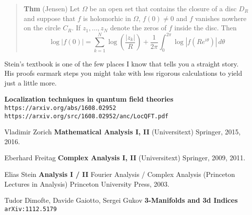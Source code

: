 \documentclass[12pt]{article}
\begin{document}
\begin{quotation}\noindent \textbf{Thm} (Jensen) Let $\Omega$ be an open set that contains the closure of a disc $D_R$ and suppose that $f$ is holomorhic in $\Omega$, $f(0) \neq 0$ and $f$ vanishes nowhere on the circle $C_R$.  If $z_1, \dots, z_N$ denote the zeros of $f$ inside the disc.  Then
$$ \log|f(0)| = \sum_{k=1}^N \log \left( \frac{|z_k|}{R}\right) 
+ \frac{1}{2\pi} \int_0^{2\pi} \log |f(Re^{i\theta})| \, d\theta $$\end{quotation}
Stein's textbook is one of the few places I know that tells you a straight story.  His proofs earmark steps you might take with less rigorous calculations to yield just a little more.

\vfill

\begin{thebibliography}{}

\item \textbf{Localization techniques in quantum field theories} \\ 
\texttt{https://arxiv.org/abs/1608.02952} \\ 
\texttt{https://arxiv.org/src/1608.02952/anc/LocQFT.pdf}

\item Vladimir Zorich \textbf{Mathematical Analysis I, II} (Universitext) Springer, 2015, 2016.

\item Eberhard Freitag \textbf{Complex Analysis I, II} (Universitext) Springer, 2009, 2011.

\item Elias Stein \textbf{Analysis I / II } Fourier Analysis / Complex Analysis (Princeton Lectures in Analysis) Princeton University Press, 2003.

\item Tudor Dimofte, Davide Gaiotto, Sergei Gukov \textbf{3-Manifolds and 3d Indices} \texttt{arXiv:1112.5179}

\end{thebibliography} 
\end{document}
